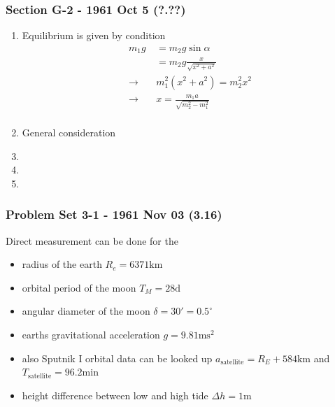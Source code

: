 \documentclass[10pt,a4paper]{book}
\theoremstyle{definition}
\begin{document}
\subsubsection{Section G-2 - 1961 Oct 5 (?.??)}
\begin{enumerate}
    \item Equilibrium is given by condition
    \begin{align}
        m_1g&=m_2g\sin\alpha\\
        &=m_2g\frac{x}{\sqrt{x^2+a^2}}\\
        \rightarrow\quad& m_1^2(x^2+a^2)=m_2^2 x^2\\
        \rightarrow\quad& x=\frac{m_1 a}{\sqrt{m_2^2-m_1^2}}\\
    \end{align}
    \item General consideration
    \begin{center}
    \end{center}
    
    \item
    \item
    \item
\end{enumerate}

\subsubsection{Problem Set 3-1 - 1961 Nov 03 (3.16)}
Direct measurement can be done for the
\begin{itemize}
    \item radius of the earth $R_e=6371\text{km}$
    \item orbital period of the moon $T_M=28\text{d}$
    \item angular diameter of the moon $\delta=30'=0.5^\circ$
    \item earths gravitational acceleration $g=9.81\text{ms}^2$
    \item also Sputnik I orbital data can be looked up $a_\text{satellite}=R_E+584\text{km}$ and $T_\text{satellite}=96.2\text{min}$
    \item height difference between low and high tide $\Delta h=1\text{m}$
\end{itemize}
\end{document}

